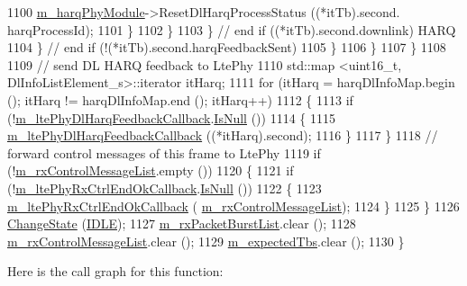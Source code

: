 \begin{DoxyCode}
1100                               \hyperlink{classns3_1_1LteSpectrumPhy_a6febfefe8b9da4a5559c5bb08bf77f26}{m\_harqPhyModule}->ResetDlHarqProcessStatus ((*itTb).second.
      harqProcessId);
1101                             \}
1102                         \}
1103                       \} \textcolor{comment}{// end if ((*itTb).second.downlink) HARQ}
1104                   \} \textcolor{comment}{// end if (!(*itTb).second.harqFeedbackSent)}
1105               \}
1106           \}
1107       \}
1108 
1109   \textcolor{comment}{// send DL HARQ feedback to LtePhy}
1110   std::map <uint16\_t, DlInfoListElement\_s>::iterator itHarq;
1111   \textcolor{keywordflow}{for} (itHarq = harqDlInfoMap.begin (); itHarq != harqDlInfoMap.end (); itHarq++)
1112     \{
1113       \textcolor{keywordflow}{if} (!\hyperlink{classns3_1_1LteSpectrumPhy_acbb9b3ab972caa0ec5c50393b71b4f72}{m\_ltePhyDlHarqFeedbackCallback}.\hyperlink{classns3_1_1Callback_aa8e27826badbf37f84763f36f70d9b54}{IsNull} ())
1114         \{
1115           \hyperlink{classns3_1_1LteSpectrumPhy_acbb9b3ab972caa0ec5c50393b71b4f72}{m\_ltePhyDlHarqFeedbackCallback} ((*itHarq).second);
1116         \}
1117     \}
1118   \textcolor{comment}{// forward control messages of this frame to LtePhy}
1119   \textcolor{keywordflow}{if} (!\hyperlink{classns3_1_1LteSpectrumPhy_ad0e520fb4b440e47e9d2b17b3c5fd05d}{m\_rxControlMessageList}.empty ())
1120     \{
1121       \textcolor{keywordflow}{if} (!\hyperlink{classns3_1_1LteSpectrumPhy_afdc84170299ddcfaa3735907365ecb6d}{m\_ltePhyRxCtrlEndOkCallback}.\hyperlink{classns3_1_1Callback_aa8e27826badbf37f84763f36f70d9b54}{IsNull} ())
1122         \{
1123           \hyperlink{classns3_1_1LteSpectrumPhy_afdc84170299ddcfaa3735907365ecb6d}{m\_ltePhyRxCtrlEndOkCallback} (
      \hyperlink{classns3_1_1LteSpectrumPhy_ad0e520fb4b440e47e9d2b17b3c5fd05d}{m\_rxControlMessageList});
1124         \}
1125     \}
1126   \hyperlink{classns3_1_1LteSpectrumPhy_a64a105b7c580b3d6dc5cd4b97d1223d9}{ChangeState} (\hyperlink{classns3_1_1LteSpectrumPhy_a52ce2cf9b4846807449c50399f6b8000a2e09524021e98183b06be8afd923a4c2}{IDLE});
1127   \hyperlink{classns3_1_1LteSpectrumPhy_ae74163b2a9dd7db93b172204c833ce4f}{m\_rxPacketBurstList}.clear ();
1128   \hyperlink{classns3_1_1LteSpectrumPhy_ad0e520fb4b440e47e9d2b17b3c5fd05d}{m\_rxControlMessageList}.clear ();
1129   \hyperlink{classns3_1_1LteSpectrumPhy_a7ac1117604ed722833af5e5538d69251}{m\_expectedTbs}.clear ();
1130 \}
\end{DoxyCode}


Here is the call graph for this function\+:





